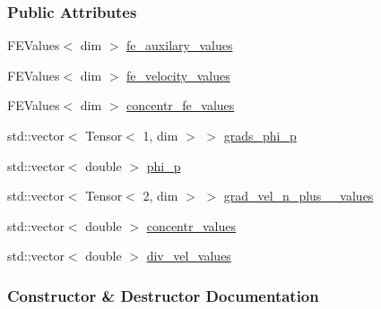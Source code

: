 \subsubsection*{Public Attributes}
\begin{DoxyCompactItemize}
\item 
F\+E\+Values$<$ dim $>$ \hyperlink{struct_assembly_1_1_scratch_1_1projection__step_a3b5a0afe1eaf675d173af8ffd7663e29}{fe\+\_\+auxilary\+\_\+values}
\item 
F\+E\+Values$<$ dim $>$ \hyperlink{struct_assembly_1_1_scratch_1_1projection__step_af91b8e433a9a308d66f5cbdbc2dd5a7b}{fe\+\_\+velocity\+\_\+values}
\item 
F\+E\+Values$<$ dim $>$ \hyperlink{struct_assembly_1_1_scratch_1_1projection__step_afeebd89eb59befac5386d69841c490b0}{concentr\+\_\+fe\+\_\+values}
\item 
std\+::vector$<$ Tensor$<$ 1, dim $>$ $>$ \hyperlink{struct_assembly_1_1_scratch_1_1projection__step_a75ecf1c6d8aa564824cc3b3376ca08f9}{grads\+\_\+phi\+\_\+p}
\item 
std\+::vector$<$ double $>$ \hyperlink{struct_assembly_1_1_scratch_1_1projection__step_a766727128326d33ecd414c713f186540}{phi\+\_\+p}
\item 
std\+::vector$<$ Tensor$<$ 2, dim $>$ $>$ \hyperlink{struct_assembly_1_1_scratch_1_1projection__step_abc3d9d363dff0cc1bbf8631afc2c777a}{grad\+\_\+vel\+\_\+n\+\_\+plus\+\_\+\_\+values}
\item 
std\+::vector$<$ double $>$ \hyperlink{struct_assembly_1_1_scratch_1_1projection__step_a7907e0ef2eddf65f20a86cc8afff9b66}{concentr\+\_\+values}
\item 
std\+::vector$<$ double $>$ \hyperlink{struct_assembly_1_1_scratch_1_1projection__step_a65701cc9156422035628e7a65783587f}{div\+\_\+vel\+\_\+values}
\end{DoxyCompactItemize}


\subsubsection{Constructor \& Destructor Documentation}
\hypertarget{struct_assembly_1_1_scratch_1_1projection__step_ab68aa92ddfce17896f9bb3088cd707fc}{}
